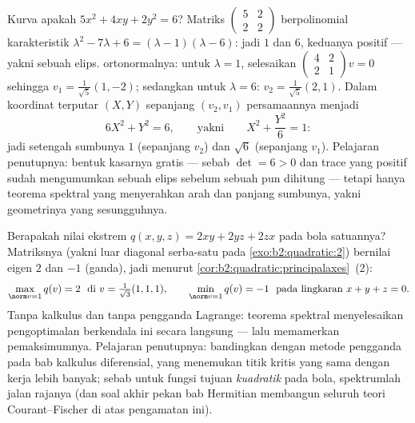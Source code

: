 \begin{example}\label{ex:b2:quadratic:ellipserun}
Kurva apakah $5x^2 + 4xy + 2y^2 = 6$? Matriks
$\begin{pmatrix} 5 & 2\\ 2 & 2\end{pmatrix}$ berpolinomial
karakteristik $\lambda^2 - 7\lambda + 6 = (\lambda - 1)(\lambda -
6)$: jadi  $1$ dan $6$, keduanya positif --- yakni sebuah elips.
 ortonormalnya: untuk $\lambda = 1$, selesaikan
$\begin{pmatrix} 4 & 2\\ 2 & 1\end{pmatrix}v = 0$ sehingga $v_1 =
\frac{1}{\sqrt5}(1, -2)$; sedangkan untuk $\lambda = 6$: $v_2 =
\frac{1}{\sqrt5}(2, 1)$. Dalam koordinat terputar $(X, Y)$
sepanjang $(v_2, v_1)$ persamaannya menjadi
\[
6X^2 + Y^2 = 6,
\qquad\text{yakni}\qquad
X^2 + \frac{Y^2}{6} = 1 :
\]
jadi setengah sumbunya $1$ (sepanjang $v_2$) dan $\sqrt6$ (sepanjang $v_1$).
Pelajaran penutupnya: bentuk kasarnya gratis --- sebab $\det
= 6 > 0$ dan trace yang positif sudah mengumumkan sebuah elips sebelum
sebuah  pun dihitung --- tetapi hanya teorema spektral yang
menyerahkan arah dan panjang sumbunya, yakni geometrinya yang
sesungguhnya.
\end{example}

\begin{example}\label{ex:b2:quadratic:sphereextremes}
Berapakah nilai ekstrem $q(x,y,z) = 2xy + 2yz + 2zx$ pada
bola satuannya? Matriksnya (yakni luar diagonal serba-satu pada
\cref{exo:b2:quadratic:2}) bernilai eigen $2$ dan $-1$
(ganda), jadi menurut \cref{cor:b2:quadratic:principalaxes}~(2):
\[
\max_{\norm v = 1} q(v) = 2
\ \text{ di } v = \tfrac{1}{\sqrt3}(1,1,1),
\qquad
\min_{\norm v = 1} q(v) = -1
\ \text{ pada lingkaran } x + y + z = 0 .
\]
Tanpa kalkulus dan tanpa pengganda Lagrange: teorema spektral
menyelesaikan pengoptimalan berkendala ini secara langsung --- lalu
memamerkan pemaksimumnya. Pelajaran penutupnya: bandingkan dengan
metode pengganda pada bab kalkulus diferensial, yang menemukan
titik kritis yang sama dengan kerja lebih banyak; sebab untuk fungsi
tujuan \emph{kuadratik} pada bola, spektrumlah jalan rajanya (dan soal
akhir pekan bab Hermitian membangun seluruh
teori Courant--Fischer di atas pengamatan ini).
\end{example}

